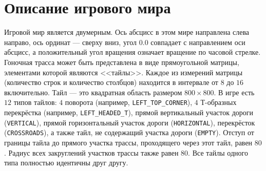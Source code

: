 \section{Описание игрового мира}

Игровой мир является двумерным. Ось абсцисс в этом мире направлена слева направо, ось ординат --- сверху вниз, угол $0.0$ совпадает с
направлением оси абсцисс, а положительный угол вращения означает вращение по часовой стрелке. Гоночная трасса может быть представлена в виде
прямоугольной матрицы, элементами которой являются <<тайлы>>. Каждое из измерений матрицы (количество строк и количество столбцов) находится
в интервале от $8$ до $16$ включительно. Тайл --- это квадратная область размером $800\times800$. В игре есть $12$ типов тайлов: $4$
поворота (например, \texttt{LEFT\_TOP\_CORNER}), $4$ Т-образных перекрёстка (например, \texttt{LEFT\_HEADED\_T}), прямой вертикальный
участок дороги (\texttt{VERTICAL}), прямой горизонтальный участок дороги (\texttt{HORIZONTAL}), перекрёсток (\texttt{CROSSROADS}), а также
тайл, не содержащий участка дороги (\texttt{EMPTY}). Отступ от границы тайла до прямого участка трассы, проходящего через этот тайл, равен
$80$. Радиус всех закруглений участков трассы также равен $80$. Все тайлы одного типа полностью идентичны друг другу.

